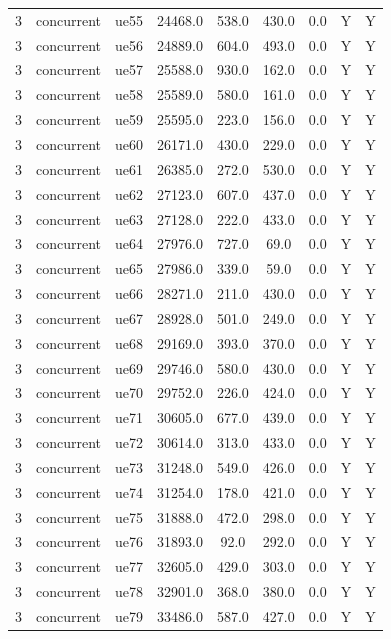 \begin{table}[ht]
\begin{tabular}{|c|c|c|c|c|c|c|c|c|}
3 & concurrent & ue55 & 24468.0 & 538.0 & 430.0 & 0.0 & Y & Y \\
3 & concurrent & ue56 & 24889.0 & 604.0 & 493.0 & 0.0 & Y & Y \\
3 & concurrent & ue57 & 25588.0 & 930.0 & 162.0 & 0.0 & Y & Y \\
3 & concurrent & ue58 & 25589.0 & 580.0 & 161.0 & 0.0 & Y & Y \\
3 & concurrent & ue59 & 25595.0 & 223.0 & 156.0 & 0.0 & Y & Y \\
3 & concurrent & ue60 & 26171.0 & 430.0 & 229.0 & 0.0 & Y & Y \\
3 & concurrent & ue61 & 26385.0 & 272.0 & 530.0 & 0.0 & Y & Y \\
3 & concurrent & ue62 & 27123.0 & 607.0 & 437.0 & 0.0 & Y & Y \\
3 & concurrent & ue63 & 27128.0 & 222.0 & 433.0 & 0.0 & Y & Y \\
3 & concurrent & ue64 & 27976.0 & 727.0 & 69.0 & 0.0 & Y & Y \\
3 & concurrent & ue65 & 27986.0 & 339.0 & 59.0 & 0.0 & Y & Y \\
3 & concurrent & ue66 & 28271.0 & 211.0 & 430.0 & 0.0 & Y & Y \\
3 & concurrent & ue67 & 28928.0 & 501.0 & 249.0 & 0.0 & Y & Y \\
3 & concurrent & ue68 & 29169.0 & 393.0 & 370.0 & 0.0 & Y & Y \\
3 & concurrent & ue69 & 29746.0 & 580.0 & 430.0 & 0.0 & Y & Y \\
3 & concurrent & ue70 & 29752.0 & 226.0 & 424.0 & 0.0 & Y & Y \\
3 & concurrent & ue71 & 30605.0 & 677.0 & 439.0 & 0.0 & Y & Y \\
3 & concurrent & ue72 & 30614.0 & 313.0 & 433.0 & 0.0 & Y & Y \\
3 & concurrent & ue73 & 31248.0 & 549.0 & 426.0 & 0.0 & Y & Y \\
3 & concurrent & ue74 & 31254.0 & 178.0 & 421.0 & 0.0 & Y & Y \\
3 & concurrent & ue75 & 31888.0 & 472.0 & 298.0 & 0.0 & Y & Y \\
3 & concurrent & ue76 & 31893.0 & 92.0 & 292.0 & 0.0 & Y & Y \\
3 & concurrent & ue77 & 32605.0 & 429.0 & 303.0 & 0.0 & Y & Y \\
3 & concurrent & ue78 & 32901.0 & 368.0 & 380.0 & 0.0 & Y & Y \\
3 & concurrent & ue79 & 33486.0 & 587.0 & 427.0 & 0.0 & Y & Y \\

\end{tabular}
\end{table}
